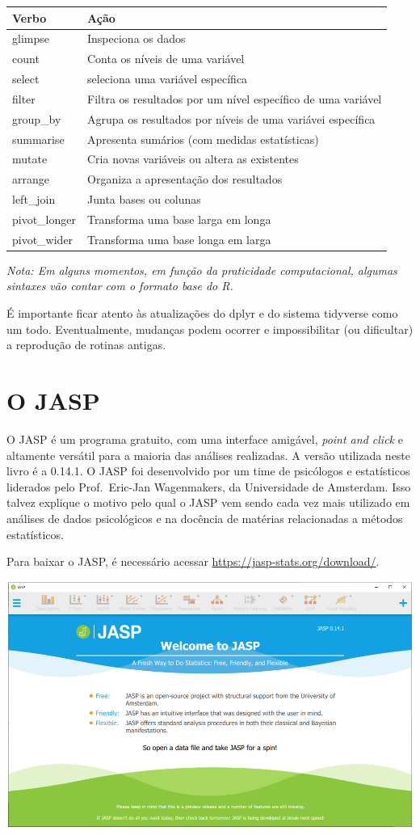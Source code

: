 \documentclass[
]{book}
\begin{document}
\begin{longtable}[]{@{}ll@{}}
\toprule
Verbo & Ação\tabularnewline
\midrule
\endhead
glimpse & Inspeciona os dados\tabularnewline
count & Conta os níveis de uma variável\tabularnewline
select & seleciona uma variável específica\tabularnewline
filter & Filtra os resultados por um nível específico de uma variável\tabularnewline
group\_by & Agrupa os resultados por níveis de uma variávei específica\tabularnewline
summarise & Apresenta sumários (com medidas estatísticas)\tabularnewline
mutate & Cria novas variáveis ou altera as existentes\tabularnewline
arrange & Organiza a apresentação dos resultados\tabularnewline
left\_join & Junta bases ou colunas\tabularnewline
pivot\_longer & Transforma uma base larga em longa\tabularnewline
pivot\_wider & Transforma uma base longa em larga\tabularnewline
\bottomrule
\end{longtable}

\emph{Nota: Em alguns momentos, em função da praticidade computacional, algumas sintaxes vão contar com o formato base do R.}

É importante ficar atento às atualizações do dplyr e do sistema tidyverse como um todo. Eventualmente, mudanças podem ocorrer e impossibilitar (ou dificultar) a reprodução de rotinas antigas.

\hypertarget{o-jasp}{%
\section{O JASP}\label{o-jasp}}

O JASP é um programa gratuito, com uma interface amigável, \emph{point and click} e altamente versátil para a maioria das análises realizadas. A versão utilizada neste livro é a 0.14.1. O JASP foi desenvolvido por um time de psicólogos e estatísticos liderados pelo Prof.~Eric-Jan Wagenmakers, da Universidade de Amsterdam. Isso talvez explique o motivo pelo qual o JASP vem sendo cada vez mais utilizado em análises de dados psicológicos e na docência de matérias relacionadas a métodos estatísticos.

Para baixar o JASP, é necessário acessar \url{https://jasp-stats.org/download/}.

\includegraphics{./img/cap_jasp_interface.png}
\end{document}
